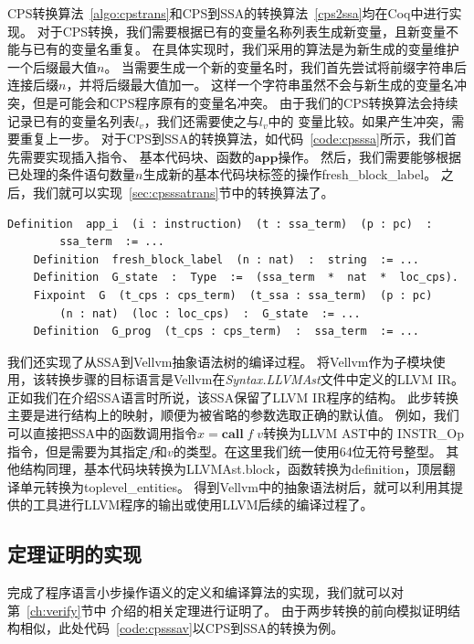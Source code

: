 CPS转换算法~\ref{algo:cpstrans}和CPS到SSA的转换算法~\ref{cps2ssa}均在Coq中进行实现。
对于CPS转换，我们需要根据已有的变量名称列表生成新变量，且新变量不能与已有的变量名重复。
在具体实现时，我们采用的算法是为新生成的变量维护一个后缀最大值$n$。
当需要生成一个新的变量名时，我们首先尝试将前缀字符串后连接后缀$n$，并将后缀最大值加一。
这样一个字符串虽然不会与新生成的变量名冲突，但是可能会和CPS程序原有的变量名冲突。
由于我们的CPS转换算法会持续记录已有的变量名列表$l_v$，我们还需要使之与$l_v$中的
变量比较。如果产生冲突，需要重复上一步。
对于CPS到SSA的转换算法，如代码~\ref{code:cpsssa}所示，我们首先需要实现插入指令、
基本代码块、函数的$\mathbf{app}$操作。
然后，我们需要能够根据已处理的条件语句数量$n$生成新的基本代码块标签的操作fresh\_block\_label。
之后，我们就可以实现~\ref{sec:cpsssatrans}节中的转换算法了。

\begin{lstlisting}[language=Coq, caption=Coq中CPS到SSA的转换算法, label=code:cpsssa]  
    Definition  app_i  (i : instruction)  (t : ssa_term)  (p : pc)  : 
        ssa_term  := ... 
    Definition  fresh_block_label  (n : nat)  :  string  := ...
    Definition  G_state  :  Type  :=  (ssa_term  *  nat  *  loc_cps).
    Fixpoint  G  (t_cps : cps_term)  (t_ssa : ssa_term)  (p : pc)  
        (n : nat)  (loc : loc_cps)  :  G_state  := ...
    Definition  G_prog  (t_cps : cps_term)  :  ssa_term  := ...
\end{lstlisting}

我们还实现了从SSA到Vellvm抽象语法树的编译过程。
将Vellvm作为子模块使用，该转换步骤的目标语言是Vellvm在\textit{Syntax.LLVMAst}文件中定义的LLVM IR。
正如我们在介绍SSA语言时所说，该SSA保留了LLVM IR程序的结构。
此步转换主要是进行结构上的映射，顺便为被省略的参数选取正确的默认值。
例如，我们可以直接把SSA中的函数调用指令$x = \mathbf{call}\; f\; v$转换为LLVM AST中的
INSTR\_Op指令，但是需要为其指定$f$和$v$的类型。在这里我们统一使用64位无符号整型。
其他结构同理，基本代码块转换为LLVMAst.block，函数转换为definition，顶层翻译单元转换为toplevel\_entities。
得到Vellvm中的抽象语法树后，就可以利用其提供的工具进行LLVM程序的输出或使用LLVM后续的编译过程了。

\subsection{定理证明的实现} \label{sec:implthm}

完成了程序语言小步操作语义的定义和编译算法的实现，我们就可以对第~\ref{ch:verify}节中
介绍的相关定理进行证明了。
由于两步转换的前向模拟证明结构相似，此处代码~\ref{code:cpsssav}以CPS到SSA的转换为例。

